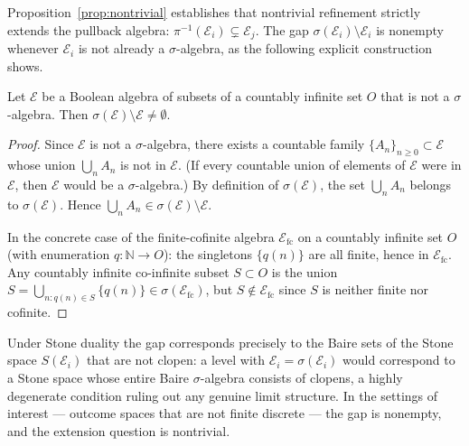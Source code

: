 Proposition~\ref{prop:nontrivial} establishes that nontrivial refinement strictly
extends the pullback algebra: $\pi^{-1}(\mathcal{E}_i) \subsetneq \mathcal{E}_j$.
The gap $\sigma(\mathcal{E}_i) \setminus \mathcal{E}_i$ is nonempty whenever
$\mathcal{E}_i$ is not already a $\sigma$-algebra, as the following explicit
construction shows.

\begin{proposition}
\label{prop:gap-nonempty}
Let $\mathcal{E}$ be a Boolean algebra of subsets of a countably infinite set $O$
that is not a $\sigma$-algebra.  Then $\sigma(\mathcal{E}) \setminus \mathcal{E}
\neq \emptyset$.
\end{proposition}

\begin{proof}
Since $\mathcal{E}$ is not a $\sigma$-algebra, there exists a countable family
$\{A_n\}_{n \geq 0} \subset \mathcal{E}$ whose union $\bigcup_n A_n$ is not in
$\mathcal{E}$.  (If every countable union of elements of $\mathcal{E}$ were in
$\mathcal{E}$, then $\mathcal{E}$ would be a $\sigma$-algebra.)  By definition
of $\sigma(\mathcal{E})$, the set $\bigcup_n A_n$ belongs to $\sigma(\mathcal{E})$.
Hence $\bigcup_n A_n \in \sigma(\mathcal{E}) \setminus \mathcal{E}$.

In the concrete case of the finite-cofinite algebra $\mathcal{E}_{\mathrm{fc}}$ on
a countably infinite set $O$ (with enumeration $q : \mathbb{N} \to O$): the
singletons $\{q(n)\}$ are all finite, hence in $\mathcal{E}_{\mathrm{fc}}$.  Any
countably infinite co-infinite subset $S \subset O$ is the union
$S = \bigcup_{n : q(n) \in S} \{q(n)\} \in \sigma(\mathcal{E}_{\mathrm{fc}})$,
but $S \notin \mathcal{E}_{\mathrm{fc}}$ since $S$ is neither finite nor cofinite.
\end{proof}

Under Stone duality the gap corresponds precisely to the Baire sets of the Stone
space $S(\mathcal{E}_i)$ that are not clopen: a level with
$\mathcal{E}_i = \sigma(\mathcal{E}_i)$ would correspond to a Stone space
whose entire Baire $\sigma$-algebra consists of clopens, a highly degenerate
condition ruling out any genuine limit structure.  In the settings of interest
--- outcome spaces that are not finite discrete --- the gap is nonempty, and the
extension question is nontrivial.

